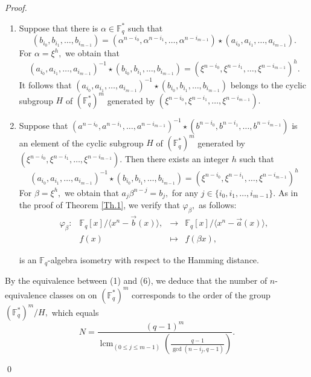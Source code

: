 \documentclass[12pt]{elsarticle}
\newcommand{\Fq}{\mathbb{F}_{q}}
\DeclareMathOperator{\lcm}{lcm}
\theoremstyle{break}
{\theorembodyfont{\upshape}
    \newtheorem{theorem}{Theorem}[section] %
    \newtheorem{lemma}[theorem]{Lemma} %
    \newtheorem{proposition}[theorem]{Proposition}
    \newtheorem{corollary}[theorem]{Corollary}
    \newtheorem{definition}[theorem]{Definition}
    \newtheorem{example}[theorem]{Example}
    \newtheorem{remark}[theorem]{Remark}
    \newtheorem{conjecture}[theorem]{Conjecture}
    \newtheorem*{proof}{{Proof}}
	\newtheorem*{notation}{Notation}
	\newtheorem*{main}{Cain Theorem}
	\newtheorem*{problem}{Problem}
}
\begin{document}
\begin{proof}
\begin{enumerate}
$$  (b_{i_0}, b_{i_1},\ldots, b_{i_{m-1}} )=  (\alpha^{n-i_0}, 
\alpha^{n-i_1} , \ldots, \alpha^{n-i_{m-1}})\star( a_{i_0},  a_{i_1}, \ldots, a_{i_{m-1}}).$$ 
\item [(5) $\Rightarrow$ (6)]
Suppose that there is $\alpha\in \Fq^{*}$ such that 
$$  (b_{i_0}, b_{i_1},\ldots, b_{i_{m-1}} )=  (\alpha^{n-i_0}, 
\alpha^{n-i_1} , \ldots, \alpha^{n-i_{m-1}})\star( a_{i_0},  a_{i_1}, \ldots, a_{i_{m-1}}).$$ 
For $\alpha= \xi^h,$ we obtain that 
$$  ( a_{i_0}, a_{i_1},\ldots, a_{i_{m-1}})^{-1}\star(b_{i_0}, b_{i_1},\ldots, b_{i_{m-1}} ) =   (\xi^{n-{i_0}}, \xi^{n-{i_1}} , \ldots, \xi^{n-i_{m-1}})^h .$$
It follows that $  ( a_{i_0},  a_{i_1}, \ldots, a_{i_{m-1}})^{-1}\star( b_{i_0},  b_{i_1}, \ldots, b_{i_{m-1}}) $ belongs to the cyclic subgroup  $H$ of $ (\Fq^{*})^m$ generated by $ (\xi^{n-{i_0}}, \xi^{n-{i_1}} , \ldots, \xi^{n-{i_{m-1}}}) .$
    \item [(6) $\Rightarrow$ (1)]  
     Suppose that $ (a^{n-{i_0}}, a^{n-{i_1}} , \ldots, a^{n-i_{m-1}})^{-1}\star(b^{n-{i_0}}, b^{n-{i_1}} , \ldots, b^{n-i_{m-1}}) $ is an element of the cyclic subgroup  $H$ of $ (\Fq^{*})^m$ generated by
$ (\xi^{n-{i_0}}, \xi^{n-{i_1}} , \ldots, \xi^{n-{i_{m-1}}}) $. Then there exists an integer $ h$ such that 
     $$  ( a_{i_0},  a_{i_1}, \ldots, a_{i_{m-1}})^{-1}\star( b_{i_0},  b_{i_1}, \ldots, b_{i_{m-1}}) =  (\xi^{n-{i_0}}, \xi^{n-{i_1}} , \ldots, \xi^{n-{i_{m-1}}})^h $$
    For $ \beta= \xi^{h}, $ we obtain  that $  a_j \beta^{n-j}= b_j, $ for any $ j\in \{ i_0,i_1,\ldots, i_{m-1}\}.$
As in the proof of Theorem \ref{Th.1}, we verify that  $ \varphi_{\beta}, $ as follows: 
  \begin{equation}
        \begin{array}{cccc}
        \varphi_{\beta} : & \mathbb{F}_q[x]/\langle x^n - \vec{b}(x) \rangle,  & \longrightarrow & \mathbb{F}_q[x] /\langle x^n - \vec{a}(x) \rangle, \\ 
        & f(x) & \longmapsto & f(\beta x),
        \end{array}
    \end{equation} 
	
	is an $\Fq$-algebra isometry with respect to the Hamming distance. 
\end{enumerate}
\noindent By the equivalence between (1) and (6), we deduce that the number of $n$-equivalence classes on on $(\Fq^*)^m$ corresponds to the order of the group $ (\Fq^*)^m/H,$ which equals $$ N=\dfrac{ (q-1)^m}{ \lcm_{ (0 \leq j\leq m-1)}\left(\frac{q-1}{ \gcd(n-i_j,q-1)}\right)}. $$ 

\qed
\end{proof}
\end{document}
